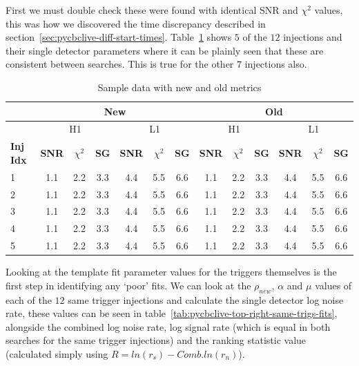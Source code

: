 First we must double check these were found with identical SNR and $\chi^{2}$ values, this was how we discovered the time discrepancy described in section~\ref{sec:pycbclive-diff-start-times}. Table~\ref{tab:pycbclive-same-trigs-snr-chi} shows $5$ of the $12$ injections and their single detector parameters where it can be plainly seen that these are consistent between searches. This is true for the other $7$ injections also.
%
\begin{table}[ht]
    \centering
    \setlength{\tabcolsep}{5pt}
    \begin{tabular}{|l|c|c|c|c|c|c|c|c|c|c|c|c|}
        \toprule
        & \multicolumn{6}{c|}{New} & \multicolumn{6}{c|}{Old} \\
        \hline
        & \multicolumn{3}{c|}{H1} & \multicolumn{3}{c|}{L1} & \multicolumn{3}{c|}{H1} & \multicolumn{3}{c|}{L1} \\
        \hline
        \textbf{Inj Idx} & \textbf{SNR} & \textbf{$\chi^{2}$} & \textbf{SG} & \textbf{SNR} & \textbf{$\chi^{2}$} & \textbf{SG} & \textbf{SNR} & \textbf{$\chi^{2}$} & \textbf{SG} & \textbf{SNR} & \textbf{$\chi^{2}$} & \textbf{SG} \\
        \hline
        1 & 1.1 & 2.2 & 3.3 & 4.4 & 5.5 & 6.6 & 1.1 & 2.2 & 3.3 & 4.4 & 5.5 & 6.6 \\
        2 & 1.1 & 2.2 & 3.3 & 4.4 & 5.5 & 6.6 & 1.1 & 2.2 & 3.3 & 4.4 & 5.5 & 6.6 \\
        3 & 1.1 & 2.2 & 3.3 & 4.4 & 5.5 & 6.6 & 1.1 & 2.2 & 3.3 & 4.4 & 5.5 & 6.6 \\
        4 & 1.1 & 2.2 & 3.3 & 4.4 & 5.5 & 6.6 & 1.1 & 2.2 & 3.3 & 4.4 & 5.5 & 6.6 \\
        5 & 1.1 & 2.2 & 3.3 & 4.4 & 5.5 & 6.6 & 1.1 & 2.2 & 3.3 & 4.4 & 5.5 & 6.6 \\
        \bottomrule
    \end{tabular}
    \caption{Sample data with new and old metrics}
    \label{tab:pycbclive-same-trigs-snr-chi}
\end{table}
%
Looking at the template fit parameter values for the triggers themselves is the first step in identifying any `poor' fits. We can look at the $\rho_{new}$, $\alpha$ and $\mu$ values of each of the $12$ same trigger injections and calculate the single detector log noise rate, these values can be seen in table~\ref{tab:pycbclive-top-right-same-trigs-fits}, alongside the combined log noise rate, log signal rate (which is equal in both searches for the same trigger injections) and the ranking statistic value (calculated simply using $R = ln(r_s) - Comb. ln(r_n)$).
